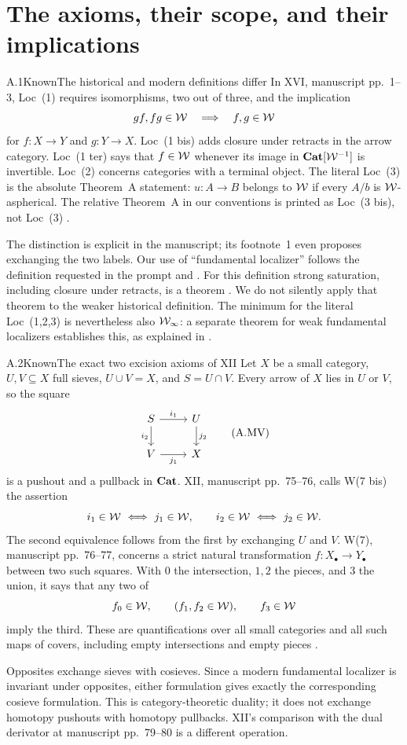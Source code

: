 \section{The axioms, their scope, and their implications}

\begin{claim}{A.1}{Known}{The historical and modern definitions differ}
In XVI, manuscript pp.~1--3, Loc~(1) requires isomorphisms, two out of three, and the implication
\[
gf,fg\in\mathcal{W}\quad\Longrightarrow\quad f,g\in\mathcal{W}
\]
for $f:X\to Y$ and $g:Y\to X$. Loc~(1 bis) adds closure under retracts in the arrow category. Loc~(1 ter) says that $f\in\mathcal{W}$ whenever its image in $\mathbf{Cat}[\mathcal{W}^{-1}]$ is invertible. Loc~(2) concerns categories with a terminal object. The literal Loc~(3) is the absolute Theorem~A statement: $u:A\to B$ belongs to $\mathcal{W}$ if every $A/b$ is $\mathcal{W}$-aspherical. The relative Theorem~A in our conventions is printed as Loc~(3 bis), not Loc~(3) \citep[ms.~1--3]{AGGrothendieckXVI}.
\end{claim}
The distinction is explicit in the manuscript; its footnote~1 even proposes exchanging the two labels. Our use of ``fundamental localizer'' follows the definition requested in the prompt and \citet[Definition~3.3.2]{RootCisinski2006}. For this definition strong saturation, including closure under retracts, is a theorem \citep[Proposition~4.2.4]{RootCisinski2006}. We do not silently apply that theorem to the weaker historical definition. The minimum for the literal Loc~(1,2,3) is nevertheless also $\mathcal{W}_{\infty}$: a separate theorem for weak fundamental localizers establishes this, as explained in .

\begin{claim}{A.2}{Known}{The exact two excision axioms of XII}
Let $X$ be a small category, $U,V\subseteq X$ full sieves, $U\cup V=X$, and $S=U\cap V$. Every arrow of $X$ lies in $U$ or $V$, so the square
\[
\begin{tikzcd}
 S\ar[r,"i_1"]\ar[d,"i_2"']&U\ar[d,"j_2"]\\
 V\ar[r,"j_1"']&X
\end{tikzcd}                                                    \tag{A.MV}
\]
is a pushout and a pullback in $\mathbf{Cat}$. XII, manuscript pp.~75--76, calls W(7 bis) the assertion
\[
i_1\in\mathcal{W}\ \Longleftrightarrow\ j_1\in\mathcal{W},
\qquad i_2\in\mathcal{W}\ \Longleftrightarrow\ j_2\in\mathcal{W}.
\]
The second equivalence follows from the first by exchanging $U$ and $V$. W(7), manuscript pp.~76--77, concerns a strict natural transformation $f:X_\bullet\to Y_\bullet$ between two such squares. With $0$ the intersection, $1,2$ the pieces, and $3$ the union, it says that any two of
\[
f_0\in\mathcal{W},\qquad (f_1,f_2\in\mathcal{W}),\qquad f_3\in\mathcal{W}
\]
imply the third. These are quantifications over all small categories and all such maps of covers, including empty intersections and empty pieces \citep[ms.~75--77]{AGGrothendieckXII}.
\end{claim}
Opposites exchange sieves with cosieves. Since a modern fundamental localizer is invariant under opposites, either formulation gives exactly the corresponding cosieve formulation. This is category-theoretic duality; it does not exchange homotopy pushouts with homotopy pullbacks. XII's comparison with the dual derivator at manuscript pp.~79--80 is a different operation.

